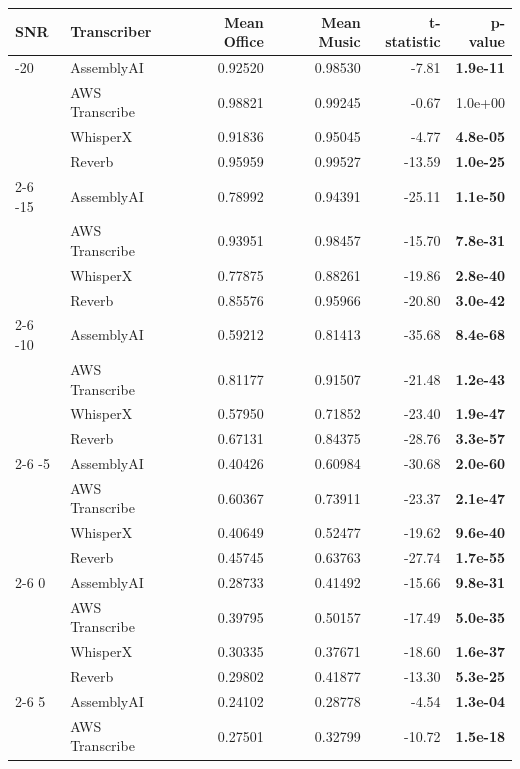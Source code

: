\begin{tabular}{llrrrr}
\toprule
SNR & Transcriber & Mean Office & Mean Music & t-statistic & p-value \\
\midrule
-20 & AssemblyAI & 0.92520 & 0.98530 & -7.81 & \textbf{ 1.9e-11} \\
  & AWS Transcribe & 0.98821 & 0.99245 & -0.67 &  1.0e+00 \\
  & WhisperX & 0.91836 & 0.95045 & -4.77 & \textbf{ 4.8e-05} \\
  & Reverb & 0.95959 & 0.99527 & -13.59 & \textbf{ 1.0e-25} \\
\cmidrule(r){2-6}
-15 & AssemblyAI & 0.78992 & 0.94391 & -25.11 & \textbf{ 1.1e-50} \\
  & AWS Transcribe & 0.93951 & 0.98457 & -15.70 & \textbf{ 7.8e-31} \\
  & WhisperX & 0.77875 & 0.88261 & -19.86 & \textbf{ 2.8e-40} \\
  & Reverb & 0.85576 & 0.95966 & -20.80 & \textbf{ 3.0e-42} \\
\cmidrule(r){2-6}
-10 & AssemblyAI & 0.59212 & 0.81413 & -35.68 & \textbf{ 8.4e-68} \\
  & AWS Transcribe & 0.81177 & 0.91507 & -21.48 & \textbf{ 1.2e-43} \\
  & WhisperX & 0.57950 & 0.71852 & -23.40 & \textbf{ 1.9e-47} \\
  & Reverb & 0.67131 & 0.84375 & -28.76 & \textbf{ 3.3e-57} \\
\cmidrule(r){2-6}
-5 & AssemblyAI & 0.40426 & 0.60984 & -30.68 & \textbf{ 2.0e-60} \\
  & AWS Transcribe & 0.60367 & 0.73911 & -23.37 & \textbf{ 2.1e-47} \\
  & WhisperX & 0.40649 & 0.52477 & -19.62 & \textbf{ 9.6e-40} \\
  & Reverb & 0.45745 & 0.63763 & -27.74 & \textbf{ 1.7e-55} \\
\cmidrule(r){2-6}
0 & AssemblyAI & 0.28733 & 0.41492 & -15.66 & \textbf{ 9.8e-31} \\
  & AWS Transcribe & 0.39795 & 0.50157 & -17.49 & \textbf{ 5.0e-35} \\
  & WhisperX & 0.30335 & 0.37671 & -18.60 & \textbf{ 1.6e-37} \\
  & Reverb & 0.29802 & 0.41877 & -13.30 & \textbf{ 5.3e-25} \\
\cmidrule(r){2-6}
5 & AssemblyAI & 0.24102 & 0.28778 & -4.54 & \textbf{ 1.3e-04} \\
  & AWS Transcribe & 0.27501 & 0.32799 & -10.72 & \textbf{ 1.5e-18} \\

\end{tabular}
